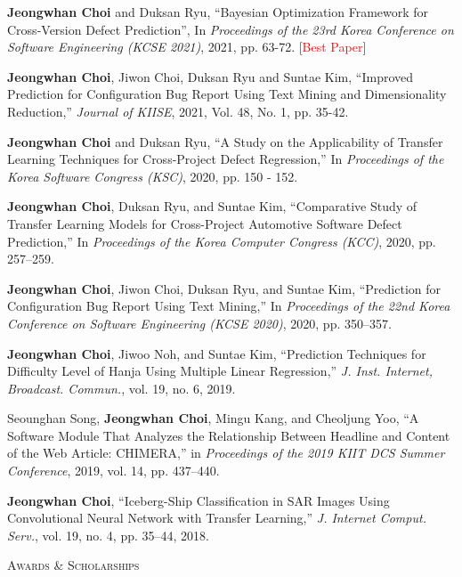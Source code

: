 \documentclass[10pt]{article}
\newenvironment{changemargin}[2]{
  \begin{list}{}{
    \setlength{\topsep}{0pt}
    \setlength{\leftmargin}{#1}
    \setlength{\rightmargin}{#2}
    \setlength{\listparindent}{\parindent}
    \setlength{\itemindent}{\parindent}
    \setlength{\parsep}{\parskip}
  }
  \item[]}{\end{list}
}
\newcommand{\lineover}{
	\begin{changemargin}{-0.05in}{-0.05in}
		\vspace*{-8pt}
		\hrulefill \\
		\vspace*{-2pt}
	\end{changemargin}
}
\newcommand{\header}[1]{
	\begin{changemargin}{-0.5in}{-0.5in}
		\scshape{#1}\\
  	\lineover
	\end{changemargin}
}
\newcommand{\presentation}[2]{
	{#1} \hfill \emph{#2}\\ \bigskip
}
\newcommand{\RED}[1]{\textcolor{red}{#1}}
\newenvironment{body} {
	\vspace*{-16pt}
	\begin{changemargin}{-0.25in}{-0.5in}
  }
	{\end{changemargin}
}
\begin{document}
\begin{body}
\presentation{\textbf{Jeongwhan Choi} and Duksan Ryu, ``Bayesian Optimization Framework for Cross-Version Defect Prediction'', In \emph{Proceedings of the 23rd Korea Conference on Software Engineering (KCSE 2021)}, 2021, pp. 63-72.  [\RED{Best Paper}]}{}
\presentation{\textbf{Jeongwhan Choi}, Jiwon Choi, Duksan Ryu and Suntae Kim, ``Improved Prediction for Configuration Bug Report Using Text Mining and Dimensionality Reduction,'' \emph{Journal of KIISE}, 2021, Vol. 48, No. 1, pp. 35-42.}{}
\presentation{\textbf{Jeongwhan Choi} and Duksan Ryu, ``A Study on the Applicability of Transfer Learning Techniques for Cross-Project Defect Regression,'' In \emph{Proceedings of the Korea Software Congress (KSC)}, 2020, pp. 150 - 152.}{}
\presentation{\textbf{Jeongwhan Choi}, Duksan Ryu, and Suntae Kim, ``Comparative Study of Transfer Learning Models for Cross-Project Automotive Software Defect Prediction,'' In \emph{Proceedings of the Korea Computer Congress (KCC)}, 2020, pp. 257–259.}{}
\presentation{\textbf{Jeongwhan Choi}, Jiwon Choi, Duksan Ryu, and Suntae Kim, ``Prediction for Configuration Bug Report Using Text Mining,'' In \emph{Proceedings of the 22nd Korea Conference on Software Engineering (KCSE 2020)}, 2020, pp. 350–357.}{}
\presentation{\textbf{Jeongwhan Choi}, Jiwoo Noh, and Suntae Kim, ``Prediction Techniques for Difficulty Level of Hanja Using Multiple Linear Regression,'' \emph{J. Inst. Internet, Broadcast. Commun.}, vol. 19, no. 6, 2019.}{}
\presentation{Seounghan Song, \textbf{Jeongwhan Choi}, Mingu Kang, and Cheoljung Yoo, ``A Software Module That Analyzes the Relationship Between Headline and Content of the Web Article: CHIMERA,'' in \emph{Proceedings of the 2019 KIIT DCS Summer Conference}, 2019, vol. 14, pp. 437–440.}{}
\presentation{\textbf{Jeongwhan Choi}, ``Iceberg-Ship Classification in SAR Images Using Convolutional Neural Network with Transfer Learning,'' \emph{J. Internet Comput. Serv.}, vol. 19, no. 4, pp. 35–44, 2018.}{}

\end{body}

\medskip

\header{Awards \& Scholarships}
\end{document}
